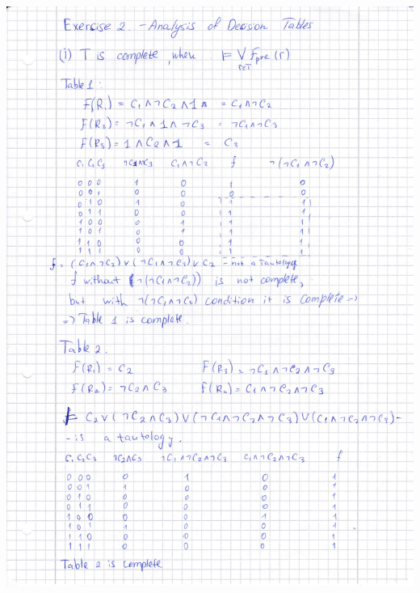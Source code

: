 \documentclass{scrartcl}
\begin{document}
\includegraphics[scale=0.75]{Ex2a.pdf}
\newpage
\end{document}
